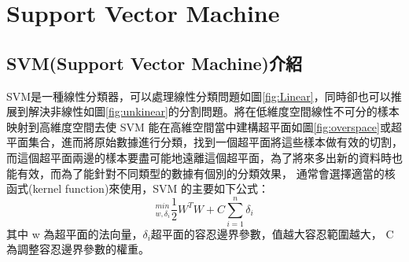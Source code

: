 \chapter{Support Vector Machine }
\label{chapter:intro}
\section{SVM(Support Vector Machine)介紹}
SVM是一種線性分類器，可以處理線性分類問題如圖\ref{fig:Linear}，同時卻也可以推展到解決非線性如圖\ref{fig:unkinear}的分割問題。將在低維度空間線性不可分的樣本映射到高維度空間去使 SVM 能在高維空間當中建構超平面如圖\ref{fig:overspace}或超平面集合，進而將原始數據進行分類，找到一個超平面將這些樣本做有效的切割，而這個超平面兩邊的樣本要盡可能地遠離這個超平面，為了將來多出新的資料時也能有效，而為了能針對不同類型的數據有個別的分類效果，
通常會選擇適當的核函式(kernel function)來使用，SVM 的主要如下公式：
\begin{equation}
	\label{equ:SVM}
	_{w,\delta_i}^{min}\frac{1}{2}W^TW+C\sum_{i=1}^{n}\delta_i
\end{equation}
其中 w 為超平面的法向量，$\delta_i$超平面的容忍邊界參數，值越大容忍範圍越大，
C 為調整容忍邊界參數的權重。




